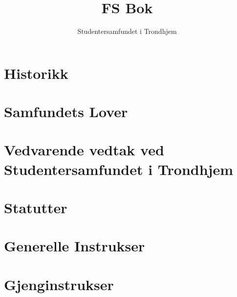 \documentclass[11pt, a4paper, twosided]{book}
\title{FS Bok}
\author{Studentersamfundet i Trondhjem}
\newcounter{lovkapittel}
\newcounter{lovparagrafcounter}
\begin{document}

\cleardoublepage




\tableofcontents

\part{Historikk}




\part{Samfundets Lover}



\setcounter{lovkapittel}{1}
\setcounter{lovparagrafcounter}{1}


\part{Vedvarende vedtak ved Studentersamfundet i Trondhjem}



\part{Statutter}



\part{Generelle Instrukser}











\part{Gjenginstrukser}







\end{document}
